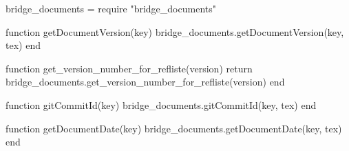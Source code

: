 \begin{luacode}

  bridge_documents = require "bridge_documents"

  function getDocumentVersion(key)
    bridge_documents.getDocumentVersion(key, tex)
  end

  function get_version_number_for_refliste(version)
   return bridge_documents.get_version_number_for_refliste(version)
  end

  function gitCommitId(key)
    bridge_documents.gitCommitId(key, tex)
  end

  function getDocumentDate(key)
    bridge_documents.getDocumentDate(key, tex)
  end

\end{luacode}

